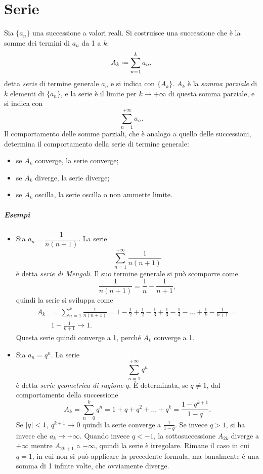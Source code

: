 \chapter{Serie}
Sia $\{a_n\}$ una successione a valori reali. Si costruisce una successione che è la somme dei termini di $a_n$ da 1 a $k$:
\[
A_k\defeq\sum_{n=1}^k a_n,
\]
detta \emph{serie} di termine generale $a_n$ e si indica con $\{A_k\}$. $A_k$ è la \emph{somma parziale} di $k$ elementi di $\{a_n\}$, e la serie è il limite per $k\to+\infty$ di questa somma parziale, e si indica con
\[
\sum_{n=1}^{+\infty}a_n.
\]
Il comportamento delle somme parziali, che è analogo a quello delle successioni, determina il comportamento della serie di termine generale:
\begin{itemize}
\item se $A_k$ converge, la serie converge;
\item se $A_k$ diverge, la serie diverge;
\item se $A_k$ oscilla, la serie oscilla o non ammette limite.
\end{itemize}
\paragraph{Esempi}
\begin{itemize}
\item Sia $a_n=\dfrac1{n(n+1)}$. La serie
\[
\sum_{n=1}^{+\infty}\frac1{n(n+1)}
\]
è detta \emph{serie di Mengoli}. Il suo termine generale si può scomporre come
\[
\frac1{n(n+1)}=\frac1{n}-\frac1{n+1},
\]
quindi la serie si sviluppa come
\[
\begin{split}
A_k&=\sum_{n=1}^k\frac1{n(n+1)}=1-\frac12+\frac12-\frac13+\frac13-\frac14-\dots+\frac1{k}-\frac1{k+1}=\\
&1-\frac1{k+1}\to 1.
\end{split}
\]
Questa serie quindi converge a 1, perché $A_k$ converge a 1.
\item Sia $a_n=q^n$. La serie
\[
\sum_{n=1}^{+\infty}q^n
\]
è detta \emph{serie geometrica di ragione} $q$. È determinata, se $q\neq 1$, dal comportamento della successione
\[
A_k=\sum_{n=0}^kq^n=1+q+q^2+\dots+q^k=\frac{1-q^{k+1}}{1-q}.
\]
Se $\lvert q\rvert<1$, $q^{k+1}\to 0$ quindi la serie converge a $\frac1{1-q}$. Se invece $q>1$, si ha invece che $a_k\to+\infty$.
Quando invece $q<-1$, la sottosuccessione $A_{2k}$ diverge a $+\infty$ mentre $A_{2k+1}$ a $-\infty$, quindi la serie è irregolare.
Rimane il caso in cui $q=1$, in cui non si può applicare la precedente formula, ma banalmente è una somma di 1 infinte volte, che ovviamente diverge.
\end{itemize}

